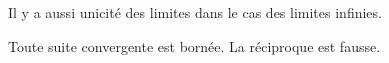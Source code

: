 \documentclass[a4paper,10pt]{report}
\begin{document}
\begin{rem} Il y a aussi unicité des limites dans le cas des limites infinies.
\end{rem}

\begin{thm} Toute suite convergente est bornée. La réciproque est fausse.
\end{thm}

\begin{preuve}
\vspace{9.5cm}
\end{preuve}
%
%
%
%
%
%
%
%
\end{document}
